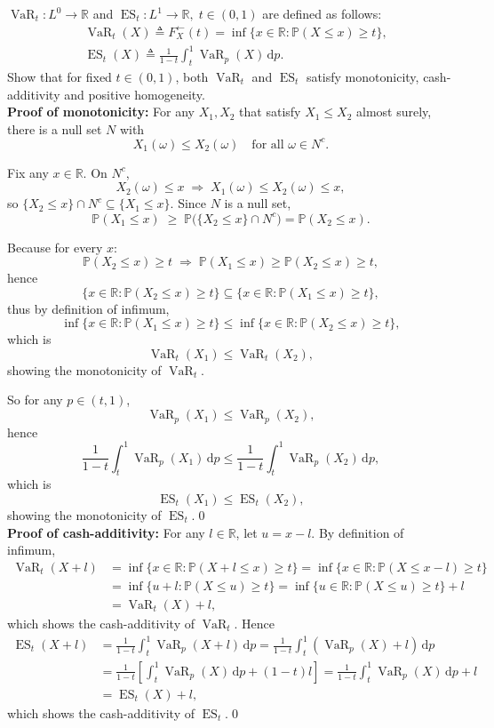 \documentclass{MFM-hw} %
\date{Sep 18, 2026}
\newcommand{\VaR}{\operatorname{VaR}}
\newcommand{\ES}{\operatorname{ES}}
\newcommand{\real}{\mathbb{R}}
\newcommand{\dd}{\,\mathrm{d}}
\renewcommand{\P}{\mathbb{P}}
\begin{document}
\maketitle
\HWproblem
$\VaR_t : L^0 \rightarrow \real $ and $\ES_t : L^1 \rightarrow \real,\; t \in (0,1)$ are defined as follows:
\begin{align*}
    & \VaR_t(X) \triangleq F_X^{\leftarrow}(t) = \inf \{x \in \real : \P(X \leq x) \geq t \},\\
    & \ES_t(X) \triangleq \frac{1}{1-t} \int_t^1 \VaR_p(X) \dd p.
\end{align*}
Show that for fixed $t \in (0,1)$, both $\VaR_t$ and $\ES_t$ satisfy monotonicity, cash-additivity and positive homogeneity.\\

\textbf{Proof of monotonicity:} For any $X_1, X_2$ that satisfy $X_1 \leq X_2$ almost surely, there is a null set $N$ with
$$
X_1(\omega) \le X_2(\omega) \quad \text{for all } \omega \in N^c .
$$

Fix any $x \in \mathbb{R}$. On $N^c$,
$$
X_2(\omega) \le x \;\Longrightarrow\; X_1(\omega) \le X_2(\omega) \le x ,
$$
so $\{X_2 \le x\} \cap N^c \subseteq \{X_1 \le x\}$. Since $N$ is a null set,
$$
 \mathbb{P}(X_1 \le x) \;\ge\; \mathbb{P}\bigl(\{X_2 \le x\} \cap N^c\bigr) = \mathbb{P}(X_2 \le x).
$$

Because for every $x$:
$$
\mathbb{P}(X_2 \le x) \ge t \;\Longrightarrow\;\mathbb{P}(X_1 \le x) \ge \mathbb{P}(X_2 \le x) \ge t,
$$
hence
\[
    \{x \in \real : \P(X_2 \leq x) \geq t \} \subseteq \{x \in \real : \P(X_1 \leq x) \geq t \},
\]
thus by definition of infimum,
\[
    \inf \{x \in \real : \P(X_1 \leq x) \geq t \} \leq \inf \{x \in \real : \P(X_2 \leq x) \geq t \},
\]
which is
\[
    \VaR_t(X_1) \leq \VaR_t(X_2),
\]
showing the monotonicity of $\VaR_t$. 

So for any $p \in (t, 1)$,
\[
    \VaR_p(X_1) \leq \VaR_p(X_2),
\]
hence
\[
    \frac{1}{1-t} \int_t^1 \VaR_p(X_1) \dd p \leq \frac{1}{1-t} \int_t^1 \VaR_p(X_2) \dd p,
\]
which is
\[
    \ES_t(X_1) \leq \ES_t(X_2),
\]
showing the monotonicity of $\ES_t$.\qed \\

\textbf{Proof of cash-additivity: }For any $l \in \real$, let $u = x - l$. By definition of infimum,
\begin{align*}
    \VaR_t(X+l) &= \inf \{ x \in \real : \P (X+l \leq x) \geq t\} = \inf \{ x \in \real : \P (X \leq x-l) \geq t\}\\
    & = \inf \{ u + l : \P (X \leq u) \geq t\} = \inf \{ u \in \real : \P (X \leq u) \geq t\} + l \\
    & = \VaR_t(X) + l,
\end{align*}
which shows the cash-additivity of $\VaR_t$. Hence
\begin{align*}
    \ES_t(X+l) &= \frac{1}{1-t} \int_t^1 \VaR_p(X+l) \dd p = \frac{1}{1-t} \int_t^1 (\VaR_p(X) + l) \dd p \\
    & = \frac{1}{1-t}\left[\int_t^1 \VaR_p(X)\dd p + (1-t)l\right] = \frac{1}{1-t}\int_t^1 \VaR_p(X) \dd p + l \\
    & = \ES_t(X)+l,
\end{align*}
which shows the cash-additivity of $\ES_t$.\qed\\
\end{document}
